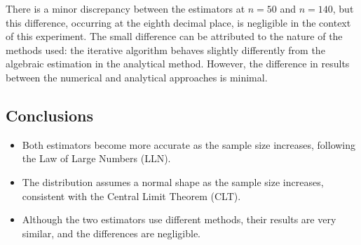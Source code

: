 \documentclass{report}
\begin{document}
There is a minor discrepancy between the estimators at \(n = 50\) and \(n = 140\), but this difference, occurring at the eighth decimal place, is negligible in the context of this experiment.
The small difference can be attributed to the nature of the methods used: the iterative algorithm behaves slightly differently from the algebraic estimation in the analytical method. However, the difference in results between the numerical and analytical approaches is minimal.

\subsection{Conclusions}
\begin{itemize}
  \item Both estimators become more accurate as the sample size increases, following the Law of Large Numbers (LLN).
  \item The distribution assumes a normal shape as the sample size increases, consistent with the Central Limit Theorem (CLT).
  \item Although the two estimators use different methods, their results are very similar, and the differences are negligible.
\end{itemize}
\end{document}
